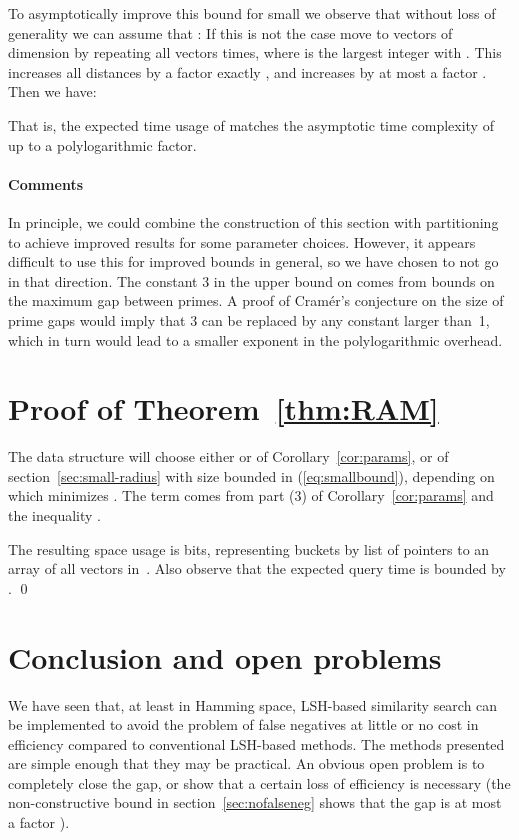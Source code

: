 \documentclass[prodmode,acmtalg]{acmsmall}
\begin{document}
To asymptotically improve this bound for small  we observe that without loss of generality we can assume that : 
If this is not the case move to vectors of dimension  by repeating all vectors  times, where  is the largest integer with . 
This increases all distances by a factor exactly , and increases  by at most a factor .
Then we have:

That is, the expected time usage of  matches the asymptotic time complexity of~\cite{Indyk1998} up to a polylogarithmic factor.


\paragraph{Comments}

In principle, we could combine the construction of this section with partitioning to achieve improved results for some parameter choices.
However, it appears difficult to use this for improved bounds in general, so we have chosen to not go in that direction.
The constant 3 in the upper bound on  comes from bounds on the maximum gap between primes. A proof of Cramér's conjecture on the size of prime gaps would imply that 3 can be replaced by any constant larger than~1, which in turn would lead to a smaller exponent in the polylogarithmic overhead.




\section{Proof of Theorem~\ref{thm:RAM}}

The data structure will choose either  or  of Corollary~\ref{cor:params}, or  of section~\ref{sec:small-radius} with size bounded in (\ref{eq:smallbound}), depending on which  minimizes . The term  comes from part (3) of Corollary~\ref{cor:params} and the inequality .

The resulting space usage is  bits, representing buckets by list of pointers to an array of all vectors in~.
Also observe that the expected query time is bounded by .
\qed



\section{Conclusion and open problems}

We have seen that, at least in Hamming space, LSH-based similarity search can be implemented to avoid the problem of false negatives at little or no cost in efficiency compared to conventional LSH-based methods.
The methods presented are simple enough that they may be practical.
An obvious open problem is to completely close the gap, or show that a certain loss of efficiency is necessary (the non-constructive bound in section~\ref{sec:nofalseneg} shows that the gap is at most a factor ).
\end{document}
